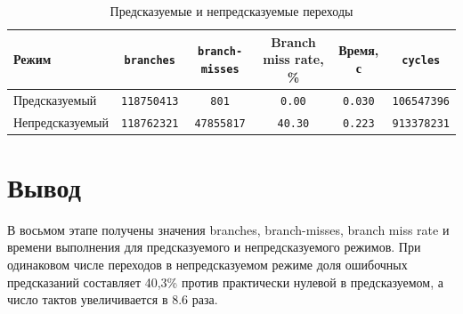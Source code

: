 \begin{table}[H]
\caption{Предсказуемые и непредсказуемые переходы}
\label{tab:branch}
\small
\begin{tabularx}{\textwidth}{|l|C|C|C|C|C|}
	\hline
	Режим & \texttt{branches} & \texttt{branch-\allowbreak misses} & Branch miss rate, \% & Время, с & \texttt{cycles} \\
	\hline
	Предсказуемый & \texttt{118750413} & \texttt{801} & \texttt{0.00} & \texttt{0.030} & \texttt{106547396} \\
	\hline
	Непредсказуемый & \texttt{118762321} & \texttt{47855817} & \texttt{40.30} & \texttt{0.223} & \texttt{913378231} \\
	\hline
\end{tabularx}
\end{table}

\section{Вывод}

В восьмом этапе получены значения branches, branch-misses, branch miss rate и времени выполнения для предсказуемого и непредсказуемого режимов.
При одинаковом числе переходов в непредсказуемом режиме доля ошибочных предсказаний составляет 40,3\% против практически нулевой в предсказуемом, а число тактов увеличивается в 8.6 раза.
